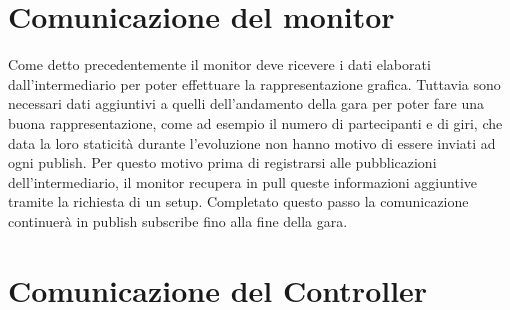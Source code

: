 
\section{Comunicazione del monitor}

Come detto precedentemente il monitor deve ricevere i dati elaborati dall’intermediario per poter effettuare la rappresentazione grafica.
Tuttavia sono necessari dati aggiuntivi a quelli dell’andamento della gara per poter fare una buona rappresentazione, come ad esempio il numero di partecipanti e di giri, che data la loro staticità durante l’evoluzione non hanno motivo di essere inviati ad ogni publish. Per questo motivo prima di registrarsi alle pubblicazioni dell’intermediario, il monitor recupera in pull queste informazioni aggiuntive tramite la richiesta di un setup.
Completato questo passo la comunicazione continuerà in publish subscribe fino alla fine della gara.


\section{Comunicazione del Controller}

